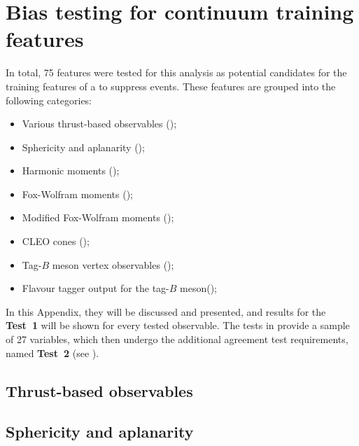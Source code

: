 \chapter{Bias testing for continuum \texorpdfstring{\BDT}{BDT} training features}\label{sec:appendix_continuum_features}

In total, 75 features were tested for this analysis as potential candidates for the training features of a \BDT to suppress \epem\ra\qqbar events.
These features are grouped into the following categories:

\begin{itemize}
    \item Various thrust-based observables ();
    \item Sphericity and aplanarity ();
    \item Harmonic moments ();
    \item Fox-Wolfram moments ();
    \item Modified Fox-Wolfram moments ();
    \item CLEO cones ();
    \item Tag-$B$ meson vertex observables ();
    \item Flavour tagger output for the tag-$B$ meson();
\end{itemize}

In this Appendix, they will be discussed and presented, and results for the \textbf{Test~1} will be shown for every tested observable.
The tests in 
provide a sample of 27 variables, which then undergo the additional agreement test requirements, named \textbf{Test~2} (see ).

\section{Thrust-based observables}\label{sec:thrusts}

\newpage

\section{Sphericity and aplanarity}\label{sec:sphericity_aplanarity}

\newpage

